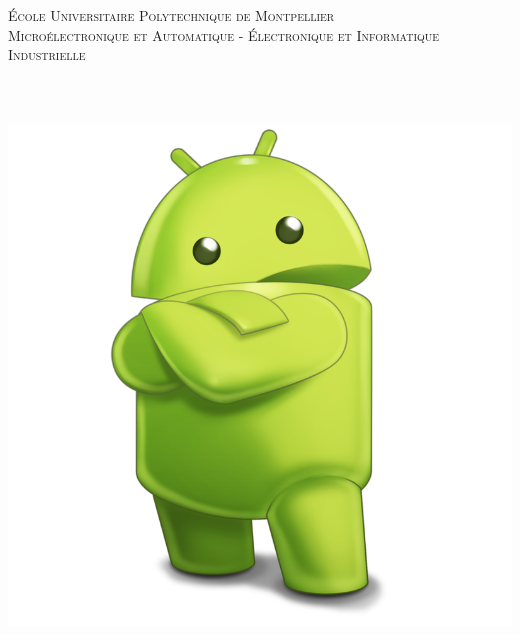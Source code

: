 \makeatletter
  \begin{titlepage}
  \centering
      {\Large \textsc{École Universitaire Polytechnique de Montpellier}}\\
      \textsc{Microélectronique et Automatique - Électronique et Informatique Industrielle }\\
    \noindent\hrulefill 
    \\
    \vspace{2 cm}
      {\large	\@date\\}
    \vspace{2cm}
       {\huge \textbf{\@title}} \\
	
	\vspace{1cm}
      \includegraphics[scale=0.15]{images/head.png}\\

    \vspace{2em}
        {\large \@author} \\
    

\end{titlepage}
